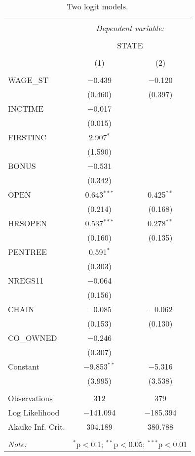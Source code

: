 
\begin{table}[H] \centering 
  \caption{Two logit models.} 
  \label{} 
\begin{tabular}{@{\extracolsep{5pt}}lcc} 
\\[-1.8ex]\hline 
\hline \\[-1.8ex] 
 & \multicolumn{2}{c}{\textit{Dependent variable:}} \\ 
\cline{2-3} 
\\[-1.8ex] & \multicolumn{2}{c}{STATE} \\ 
\\[-1.8ex] & (1) & (2)\\ 
\hline \\[-1.8ex] 
 WAGE\_ST & $-$0.439 & $-$0.120 \\ 
  & (0.460) & (0.397) \\ 
  INCTIME & $-$0.017 &  \\ 
  & (0.015) &  \\ 
  FIRSTINC & 2.907$^{*}$ &  \\ 
  & (1.590) &  \\ 
  BONUS & $-$0.531 &  \\ 
  & (0.342) &  \\ 
  OPEN & 0.643$^{***}$ & 0.425$^{**}$ \\ 
  & (0.214) & (0.168) \\ 
  HRSOPEN & 0.537$^{***}$ & 0.278$^{**}$ \\ 
  & (0.160) & (0.135) \\ 
  PENTREE & 0.591$^{*}$ &  \\ 
  & (0.303) &  \\ 
  NREGS11 & $-$0.064 &  \\ 
  & (0.156) &  \\ 
  CHAIN & $-$0.085 & $-$0.062 \\ 
  & (0.153) & (0.130) \\ 
  CO\_OWNED & $-$0.246 &  \\ 
  & (0.307) &  \\ 
  Constant & $-$9.853$^{**}$ & $-$5.316 \\ 
  & (3.995) & (3.538) \\ 
 \hline \\[-1.8ex] 
Observations & 312 & 379 \\ 
Log Likelihood & $-$141.094 & $-$185.394 \\ 
Akaike Inf. Crit. & 304.189 & 380.788 \\ 
\hline 
\hline \\[-1.8ex] 
\textit{Note:}  & \multicolumn{2}{r}{$^{*}$p$<$0.1; $^{**}$p$<$0.05; $^{***}$p$<$0.01} \\ 
\end{tabular} 
\end{table} 
